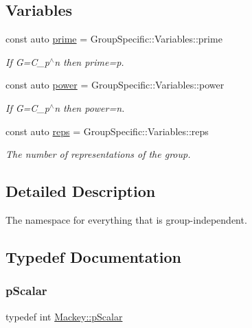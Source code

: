 \subsection*{Variables}
\begin{DoxyCompactItemize}
\item 
const auto \hyperlink{namespaceMackey_a77e059c6f9b4c6ea096fcf94a7880bc3}{prime} = Group\+Specific\+::\+Variables\+::prime
\begin{DoxyCompactList}\small\item\em If G=C\+\_\+p$^\wedge$n then prime=p. \end{DoxyCompactList}\item 
const auto \hyperlink{namespaceMackey_aafdaaabd06dd9ceefe6fa4f26d13a60d}{power} = Group\+Specific\+::\+Variables\+::power
\begin{DoxyCompactList}\small\item\em If G=C\+\_\+p$^\wedge$n then power=n. \end{DoxyCompactList}\item 
const auto \hyperlink{namespaceMackey_af282e8433677f2812cb242359f4cd0c1}{reps} = Group\+Specific\+::\+Variables\+::reps
\begin{DoxyCompactList}\small\item\em The number of representations of the group. \end{DoxyCompactList}\end{DoxyCompactItemize}


\subsection{Detailed Description}
The namespace for everything that is group-\/independent. 

\subsection{Typedef Documentation}
\mbox{\label{namespaceMackey_a4f147e328c520f568f5d3adf1c75f514}} 
\subsubsection{\texorpdfstring{p\+Scalar}{pScalar}}
{\footnotesize\ttfamily typedef int \hyperlink{namespaceMackey_a4f147e328c520f568f5d3adf1c75f514}{Mackey\+::p\+Scalar}}

